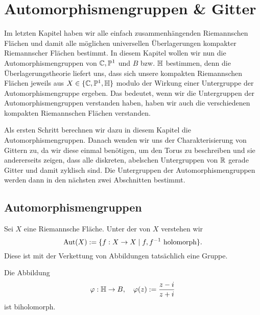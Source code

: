 
\section{Automorphismengruppen \& Gitter}
\label{sec:auto}

Im letzten Kapitel haben wir alle einfach zusammenhängenden
Riemannschen Flächen und damit alle möglichen universellen
Überlagerungen kompakter Riemannscher Flächen bestimmt. In diesem
Kapitel wollen wir nun die Automorphismengruppen von $\mathbb{C}, \mathbb{P}^1$ und $B$
bzw. $\mathbb{H}$ bestimmen, denn die Überlagerungstheorie liefert uns, dass
sich unsere kompakten Riemannschen Flächen jeweils aus $X \in \{ \mathbb{C},
\mathbb{P}^1, \mathbb{H}\}$ modulo der Wirkung einer Untergruppe der
Automorphismengruppe ergeben. Das bedeutet, wenn wir die
Untergruppen der Automorphismengruppen verstanden haben, haben wir
auch die verschiedenen kompakten Riemannschen Flächen verstanden.

Als ersten Schritt berechnen wir dazu in diesem Kapitel die
Automorphismengruppen. Danach wenden wir uns der Charakterisierung von
Gittern zu, da wir diese einmal benötigen, um den Torus zu beschreiben
und sie andererseits zeigen, dass alle diskreten, abelschen
Untergruppen von $\mathbb{R}$ gerade Gitter und damit zyklisch sind. Die
Untergruppen der Automorphismengruppen werden dann in den
nächsten zwei Abschnitten bestimmt.

\subsection{Automorphismengruppen}

\begin{defin}
  Sei $X$ eine Riemannsche Fläche. Unter der
   von $X$ verstehen wir
  \[
  \operatorname{Aut}(X) := \{ f: X \rightarrow X \mid f,f^{-1} \text{ holomorph} \}.
  \]
  Diese ist mit der Verkettung von Abbildungen tatsächlich eine Gruppe.
\end{defin}

\begin{lemma}
  \label{lemma:kreis-halbebene}
  Die Abbildung
  \[
  \varphi: \mathbb{H} \rightarrow B, \quad \varphi(z) := \frac{z-i}{z+i}
  \]
  ist biholomorph.
\end{lemma}

